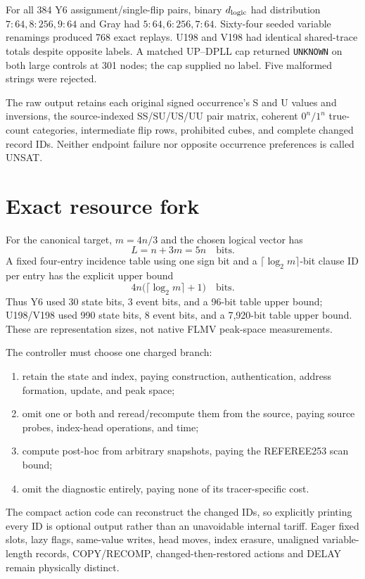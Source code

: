 \documentclass[11pt]{article}
\begin{document}
For all 384 Y6 assignment/single-flip pairs, binary $d_{\rm logic}$ had distribution $7:64,8:256,9:64$ and Gray had $5:64,6:256,7:64$.  Sixty-four seeded variable renamings produced 768 exact replays.  U198 and V198 had identical shared-trace totals despite opposite labels.  A matched UP--DPLL cap returned \texttt{UNKNOWN} on both large controls at 301 nodes; the cap supplied no label.  Five malformed strings were rejected.

The raw output retains each original signed occurrence's S and U values and inversions, the source-indexed SS/SU/US/UU pair matrix, coherent $0^n/1^n$ true-count categories, intermediate flip rows, prohibited cubes, and complete changed record IDs.  Neither endpoint failure nor opposite occurrence preferences is called UNSAT.

\section{Exact resource fork}
For the canonical target, $m=4n/3$ and the chosen logical vector has
\[
 L=n+3m=5n\quad\text{bits}.
\]
A fixed four-entry incidence table using one sign bit and a $\lceil\log_2m\rceil$-bit clause ID per entry has the explicit upper bound
\[
 4n\bigl(\lceil\log_2m\rceil+1\bigr)\quad\text{bits}.
\]
Thus Y6 used 30 state bits, 3 event bits, and a 96-bit table upper bound; U198/V198 used 990 state bits, 8 event bits, and a 7,920-bit table upper bound.  These are representation sizes, not native FLMV peak-space measurements.

The controller must choose one charged branch:
\begin{enumerate}
\item retain the state and index, paying construction, authentication, address formation, update, and peak space;
\item omit one or both and reread/recompute them from the source, paying source probes, index-head operations, and time;
\item compute post-hoc from arbitrary snapshots, paying the REFEREE253 scan bound;
\item omit the diagnostic entirely, paying none of its tracer-specific cost.
\end{enumerate}
The compact action code can reconstruct the changed IDs, so explicitly printing every ID is optional output rather than an unavoidable internal tariff.  Eager fixed slots, lazy flags, same-value writes, head moves, index erasure, unaligned variable-length records, COPY/RECOMP, changed-then-restored actions and DELAY remain physically distinct.
\end{document}
